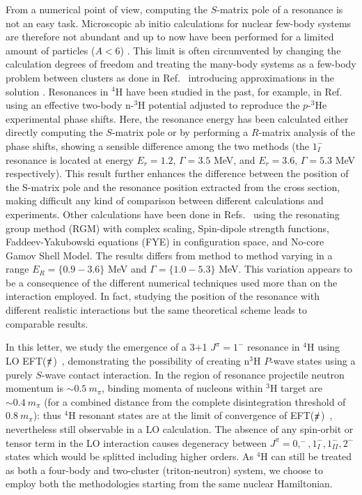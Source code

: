 \documentclass[5p,times]{elsarticle}
\newcommand{\eftnopi}{\mbox{EFT($\slashed{\pi}$) }}
\begin{document}
From a numerical point of view, computing the $S$-matrix pole of a resonance is not an easy task. 
Microscopic ab initio calculations for nuclear few-body systems are therefore not abundant and up to now have been performed for a limited amount of particles ($A<6$) \cite{Li:2019pmg,Lazauskas:2019cxj}. 
This limit is often circumvented by changing the calculation
degrees of freedom and treating the many-body systems as a few-body problem between clusters as done in Ref.~\cite{Arai:2003ek,deDiego:2007rd} introducing approximations in the solution \cite{doweneedthis}.
Resonances in $^4$H have been studied in the past, for example, in Ref.~\cite{deDiego:2007rd} using an effective two-body n-$^3$H potential adjusted to reproduce the $p$-$^3$He experimental phase shifts. 
Here, the resonance energy has been calculated either directly computing the $S$-matrix pole or by performing a $R$-matrix analysis of the phase shifts, showing a sensible difference among the two methods (the $1^-_I$ resonance is located at energy $E_r=1.2$, $\Gamma=3.5$ MeV, and $E_r=3.6$, $\Gamma=5.3$ MeV respectively).
%
This result further enhances the difference between the position of the S-matrix pole and the resonance position extracted from the cross section, making difficult any kind of comparison between different calculations and experiments.
%
Other calculations have been done in Refs.~\cite{Arai:2003ek,Horiuchi:2013iw,Lazauskas:2019cxj,Li:2021ado} using the resonating group method (RGM) with complex scaling, Spin-dipole strength functions, Faddeev-Yakubowski equations (FYE) in configuration space, and No-core Gamov Shell Model. The results differs from method to method varying in a range $E_R=\{0.9-3.6\}$ MeV and $\Gamma=\{1.0-5.3\}$ MeV.
This variation appears to be a consequence of the different numerical techniques used more than on the interaction employed. In fact, studying the position of the resonance with different realistic interactions but the same theoretical scheme \cite{Lazauskas:2019cxj,Li:2021ado} leads to comparable results.

%
%

In this letter, we study the emergence of a 3+1 $J^{\pi}=1^-$ resonance in $^4$H using LO \eftnopi, demonstrating the possibility of creating n$^3$H $P$-wave states using a purely $S$-wave contact interaction. 
In the region of resonance projectile neutron momentum is $\sim 0.5~m_\pi$, binding momenta of nucleons within $^3$H target are $\sim 0.4~m_\pi$ (for a combined distance from the complete disintegration threshold of $0.8~m_\pi$): thus $^4$H resonant states are at the limit of convergence of \eftnopi, nevertheless still observable in a LO calculation. The absence of any spin-orbit or tensor term in the LO interaction causes degeneracy between $J^{\pi}=0,^-,1^-_I,1^-_{II},2^-$ states which would be splitted including higher orders. 
As $^4$H can still be treated as both a four-body and two-cluster (triton-neutron) system, we choose to employ both the methodologies starting from the same nuclear Hamiltonian.
\end{document}

